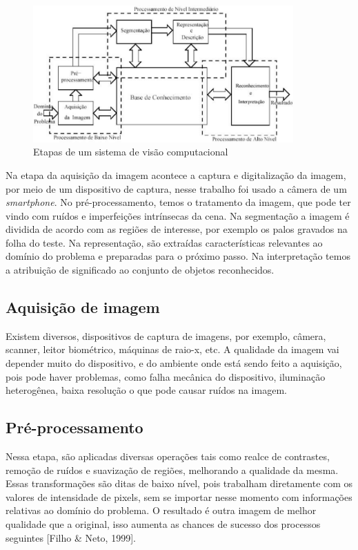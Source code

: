\begin{figure}[H]
 \centering
 \includegraphics[width=0.89\textwidth]{./fig/fundamentacao/pdi2}
 \caption{Etapas de um sistema de visão computacional}
 \label{fig:imgpdi}
\end{figure}

Na etapa da aquisição da imagem acontece a captura e digitalização da imagem, por meio de um dispositivo de captura, nesse trabalho foi usado a câmera de um \textit{smartphone}. No pré-processamento, temos o tratamento da imagem, que pode ter vindo com ruídos e imperfeições intrínsecas da cena.  Na segmentação a imagem é dividida de acordo com as regiões de interesse, por exemplo os palos gravados na folha do teste. Na representação, são extraídas características relevantes ao domínio do problema e preparadas para o próximo passo. Na interpretação temos a atribuição de significado ao conjunto de objetos reconhecidos. 

\subsection{Aquisição de imagem}
\label{sub:aquis}

Existem diversos, dispositivos de captura de imagens, por exemplo, câmera, scanner, leitor biométrico, máquinas de raio-x, etc. A qualidade da imagem vai depender muito do dispositivo, e do ambiente onde está sendo feito a aquisição, pois pode haver problemas, como falha mecânica do dispositivo, iluminação heterogênea, baixa resolução o que pode causar ruídos na imagem.

\subsection{Pré-processamento}
\label{sub:pre-process}

Nessa etapa, são aplicadas diversas operações tais como realce de contrastes, remoção de ruídos e suavização de regiões, melhorando a qualidade da mesma. Essas transformações são ditas de baixo nível, pois trabalham diretamente com os valores de intensidade de pixels, sem se importar nesse momento com informações relativas ao domínio do problema. O resultado é outra imagem de melhor qualidade que a original, isso aumenta as chances de sucesso dos processos seguintes [Filho & Neto, 1999].

